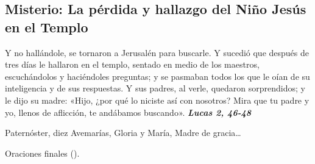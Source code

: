 \documentclass[./rosary.tex]{subfiles}
\newcounter{joyful-counter}
\begin{document}
\subsection*{ Misterio: La pérdida y hallazgo del Niño Jesús en el Templo}

Y no hallándole, se tornaron a Jerusalén para buscarle. Y sucedió que después de tres días le hallaron en el templo,
sentado en medio de los maestros, escuchándolos y haciéndoles preguntas; y se pasmaban todos los que le oían de su
inteligencia y de sus respuestas. Y sus padres, al verle, quedaron sorprendidos; y le dijo su madre:
«Hijo, ¿por qué lo niciste así con nosotros? Mira que tu padre y yo, llenos de aflicción, te andábamos buscando». 
\textbf{\emph{Lucas 2, 46-48}}

\begin{center}
      Paternóster, diez Avemarías, Gloria y María, Madre de gracia{\ldots}
      
      Oraciones finales ().
\end{center}
\end{document}
